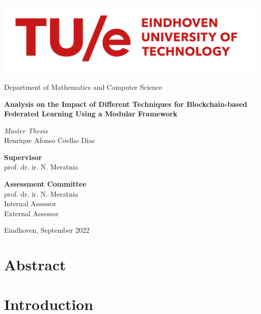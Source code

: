\documentclass[12pt,a4paper,oneside]{book}
\begin{document}

\begin{titlepage}
\centering
\includegraphics[width=0.7\linewidth]{graphics/tue-logo.png}\par
Department of Mathematics and Computer Science

\vspace{3cm}

{\sffamily\LARGE\textbf{
Analysis on the Impact of Different Techniques for Blockchain-based Federated Learning Using a Modular Framework
}}

\par\vspace{2cm}
{\large\textit{Master Thesis}}\\
\vspace{0.2cm}
{\large Henrique Afonso Coelho Dias}

\vspace{2cm}

\textbf{Supervisor} \\
\vspace{0.1cm}
prof. dr. ir. N. Meratnia

\par

\textbf{Assessment Committee} \\
\vspace{0.1cm}
prof. dr. ir. N. Meratnia \\
Internal Assessor \\
External Assessor \\

\vfill

{Eindhoven, September 2022}

\end{titlepage}

\chapter*{Abstract}\label{chapter:abstract}


\tableofcontents

\listoffigures

\listoftables

\chapter{Introduction}\label{chapter:introduction}

\end{document}
